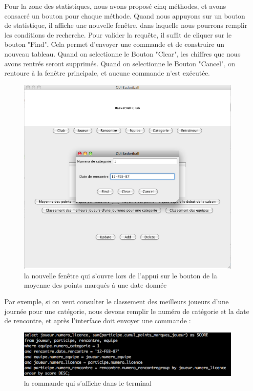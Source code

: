 \documentclass{article}
\begin{document}
 \newpage
Pour la zone des statistiques, nous avons proposé cinq méthodes, et avons consacré un bouton pour chaque méthode. Quand nous appuyons sur un bouton de statistique, il affiche une nouvelle fenêtre, dans laquelle nous pourrons remplir les conditions de recherche. Pour valider la requête, il suffit de cliquer sur le bouton "Find". Cela permet d'envoyer une commande et de construire un nouveau tableau. Quand on selectionne le Bouton "Clear", les chiffres que nous avons rentrés seront supprimés. Quand on selectionne le Bouton "Cancel", on rentoure à la fenêtre principale, et aucune commande n'est exécutée. \\
 
\begin{figure}[!h]
\centering
\includegraphics[scale = 0.4] {2.png}
\caption{la nouvelle fenêtre qui s'ouvre lors de l'appui sur le bouton de la moyenne des points marqués à une date donnée }
\end{figure}

\newpage

Par exemple, si on veut consulter le classement des meilleurs joueurs d'une journée pour une catégorie, nous devons remplir le numéro de catégorie et la date de rencontre, et après l'interface doit envoyer une commande : \\


\begin{figure}[!h]
\centering
\includegraphics[scale = 0.5] {3.png}
\caption{la commande qui s'affiche dans le terminal}
\end{figure}
\end{document}
